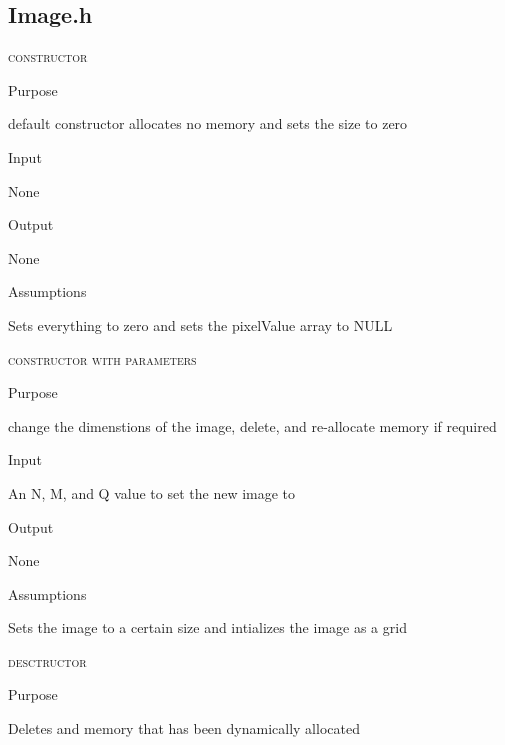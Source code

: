 \documentclass[pdftex, 11pt]{article}
\begin{document}
\subsection{Image.h}
\begin{description}

	\item{\textsc{constructor}}
		\begin{description}
			\item{Purpose}

				default constructor allocates no memory and sets the size to zero 

			\item{Input}

				None

			\item{Output}

				None

			\item{Assumptions}

				Sets everything to zero and 
				sets the pixelValue array to NULL

		\end{description}


	\item{\textsc{constructor with parameters}}
		\begin{description}
			\item{Purpose}

				change the dimenstions of the image, delete,
				and re-allocate memory if required

			\item{Input}

				An N, M, and Q value to set the new image to

			\item{Output}

				None

			\item{Assumptions}

				Sets the image to a certain size and intializes the
				image as a grid

		\end{description}



	\item{\textsc{desctructor}}
		\begin{description}
			\item{Purpose}

				Deletes and memory that has been dynamically allocated


\end{description}
\end{description}
\end{document}
